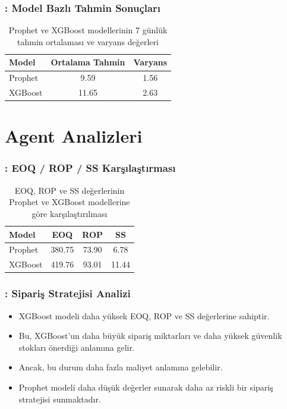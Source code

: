 \documentclass[12pt]{beamer}
\begin{document}
\begin{frame}
	\frametitle{\insertsection: Model Bazlı Tahmin Sonuçları}
	\begin{table}
		\centering
		\small
		\begin{tabular}{l c c}
			\toprule
			\textbf{Model} & \textbf{Ortalama Tahmin} &
			\textbf{Varyans}                                 \\
			\midrule
			Prophet        & 9.59                     & 1.56 \\
			XGBoost        & 11.65                    & 2.63 \\
			\bottomrule
		\end{tabular}
		\caption{\small Prophet ve XGBoost modellerinin 7 günlük tahmin
			ortalaması ve varyans değerleri}
	\end{table}
\end{frame}


\section{Agent Analizleri}
\begin{frame}
	\frametitle{\insertsection: EOQ / ROP / SS Karşılaştırması}
	\begin{table}
		\centering
		\renewcommand{\arraystretch}{1.2}
		\begin{tabular}{l|c|c|c}
			\hline \hline
			\textbf{Model} & \textbf{EOQ} & \textbf{ROP} &
			\textbf{SS}                                          \\
			\hline
			Prophet        & 380.75       & 73.90        & 6.78  \\ \hline
			XGBoost        & 419.76       & 93.01        & 11.44 \\
			\hline
		\end{tabular}
		\vspace{0.3em}
		\caption{\small EOQ, ROP ve SS değerlerinin Prophet ve XGBoost
			modellerine göre karşılaştırılması}
	\end{table}
\end{frame}

\begin{frame}
	\frametitle{\insertsection: Sipariş Stratejisi Analizi}
	\begin{itemize}
		\item XGBoost modeli daha yüksek EOQ, ROP ve SS değerlerine
		      sahiptir.
		\item  Bu, XGBoost'un daha büyük sipariş miktarları ve daha
		      yüksek güvenlik stokları önerdiği anlamına gelir.
		\item Ancak, bu durum daha fazla maliyet anlamına gelebilir.
		\item Prophet modeli daha düşük değerler sunarak daha az riskli
		      bir sipariş stratejisi sunmaktadır.
	\end{itemize}
\end{frame}
\end{document}
